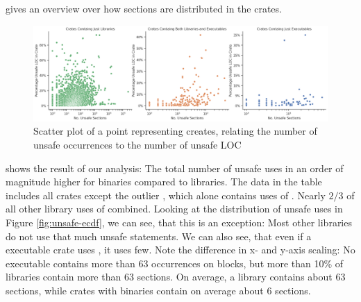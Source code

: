 \documentclass[twoside, english]{sdqthesis}
\theoremstyle{definition}
\begin{document}
 gives an overview over how  sections are distributed in the crates.
\begin{figure}[h]
	\centering
	\includegraphics[width=0.99\linewidth, clip, trim={0.2cm 0.2cm 0.2cm 0.2cm}]{../scatter-occurences-vs-loc.png}
	\caption{Scatter plot of a point representing creates, relating the number of unsafe occurrences to the number of unsafe LOC}
	\label{fig:unsafe-scatter}
\end{figure}

 shows the result of our analysis: The total number of unsafe uses in an order of magnitude higher for binaries compared to libraries.
The data in the table includes all crates except the outlier , which alone contains  uses of . Nearly $2 / 3$ of all other library uses of  combined.
Looking at the distribution of unsafe uses in Figure \ref{fig:unsafe-ecdf}, we can see, that this is an exception: Most other libraries do not use that much unsafe statements. We can also see, that even if a executable crate uses , it uses few. Note the difference in x- and y-axis scaling: No executable contains more than 63 occurrences on  blocks, but more than 10\% of libraries contain more than 63  sections.
On average, a library contains about 63  sections, while crates with binaries contain on average about 6  sections.


\end{document}
